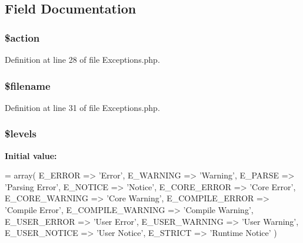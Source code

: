 \subsection{Field Documentation}
\hypertarget{class_c_i___exceptions_aa698a3e72116e8e778be0e95d908ee30}{
\subsubsection[{\$action}]{\setlength{\rightskip}{0pt plus 5cm}\$action}}\label{class_c_i___exceptions_aa698a3e72116e8e778be0e95d908ee30}


Definition at line 28 of file Exceptions.\-php.

\hypertarget{class_c_i___exceptions_a0722441477f957078ee2437054556cbc}{
\subsubsection[{\$filename}]{\setlength{\rightskip}{0pt plus 5cm}\$filename}}\label{class_c_i___exceptions_a0722441477f957078ee2437054556cbc}


Definition at line 31 of file Exceptions.\-php.

\hypertarget{class_c_i___exceptions_a1035dc0448354cc79f8f9e1ca8dfd0cb}{
\subsubsection[{\$levels}]{\setlength{\rightskip}{0pt plus 5cm}\$levels}}\label{class_c_i___exceptions_a1035dc0448354cc79f8f9e1ca8dfd0cb}
{\bfseries Initial value\-:}
\begin{DoxyCode}
= array(
                        E\_ERROR             =>  \textcolor{stringliteral}{'Error'},
                        E\_WARNING           =>  \textcolor{stringliteral}{'Warning'},
                        E\_PARSE             =>  \textcolor{stringliteral}{'Parsing Error'},
                        E\_NOTICE            =>  \textcolor{stringliteral}{'Notice'},
                        E\_CORE\_ERROR        =>  \textcolor{stringliteral}{'Core Error'},
                        E\_CORE\_WARNING      =>  \textcolor{stringliteral}{'Core Warning'},
                        E\_COMPILE\_ERROR     =>  \textcolor{stringliteral}{'Compile Error'},
                        E\_COMPILE\_WARNING   =>  \textcolor{stringliteral}{'Compile Warning'},
                        E\_USER\_ERROR        =>  \textcolor{stringliteral}{'User Error'},
                        E\_USER\_WARNING      =>  \textcolor{stringliteral}{'User Warning'},
                        E\_USER\_NOTICE       =>  \textcolor{stringliteral}{'User Notice'},
                        E\_STRICT            =>  \textcolor{stringliteral}{'Runtime Notice'}
                    )
\end{DoxyCode}


